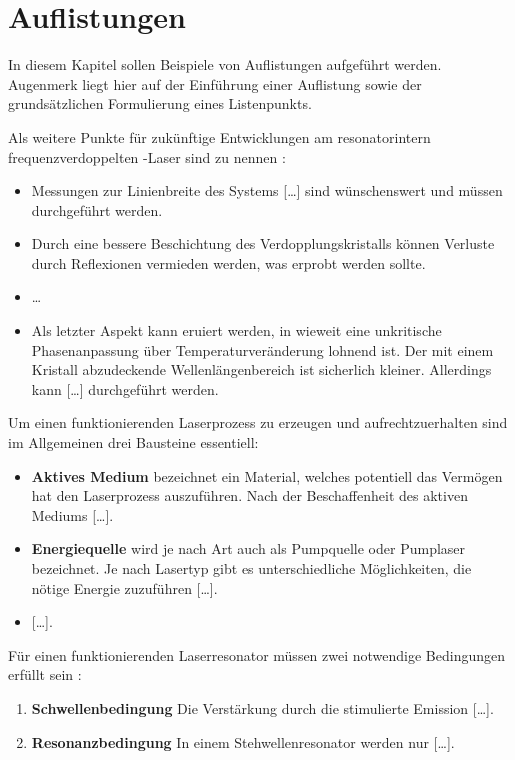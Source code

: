 \chapter{Auflistungen}
\label{sec:auflistungen}

In diesem Kapitel sollen Beispiele von Auflistungen aufgeführt werden. Augenmerk liegt hier auf der Einführung einer Auflistung sowie der grundsätzlichen Formulierung eines Listenpunkts. 

Als weitere Punkte für zukünftige Entwicklungen am resonatorintern frequenzverdoppelten \tisa-Laser sind zu nennen \cite{Naubereit.2012}: 

\begin{itemize}
	\item Messungen zur Linienbreite des Systems [\dots] sind wünschenswert und müssen durchgeführt werden. 
	\item Durch eine bessere Beschichtung des Verdopplungskristalls können Verluste durch Reflexionen vermieden werden, was erprobt werden sollte. 
	\item \dots
	\item Als letzter Aspekt kann eruiert werden, in wieweit eine unkritische Phasenanpassung über Temperaturveränderung lohnend ist. Der mit einem Kristall abzudeckende Wellenlängenbereich ist sicherlich kleiner. Allerdings kann [\dots] durchgeführt werden. 
\end{itemize}

Um einen funktionierenden Laserprozess zu erzeugen \cite{Naubereit.2014} und aufrechtzuerhalten sind im Allgemeinen drei Bausteine essentiell: 

\begin{itemize}
	\item \textbf{Aktives Medium} bezeichnet ein Material, welches potentiell das Vermögen hat den Laserprozess auszuführen. Nach der Beschaffenheit des aktiven Mediums [\dots]. 
	\item \textbf{Energiequelle} wird je nach Art auch als Pumpquelle oder Pumplaser bezeichnet. Je nach Lasertyp gibt es unterschiedliche Möglichkeiten, die nötige Energie zuzuführen [\dots].
	\item{} [\dots].
\end{itemize}

Für einen funktionierenden Laserresonator müssen zwei notwendige Bedingungen erfüllt sein \cite{Naubereit.2014}: 
\begin{enumerate}
	\item \textbf{Schwellenbedingung} Die Verstärkung durch die stimulierte Emission [\dots]. 
	\item \textbf{Resonanzbedingung} In einem Stehwellenresonator werden nur [\dots]. 
\end{enumerate}


